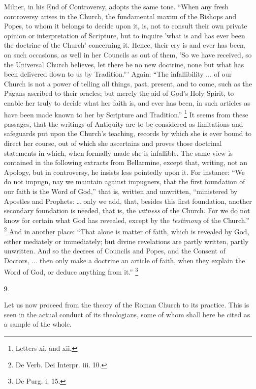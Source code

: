 Milner, in his End of Controversy, adopts the same tone. ``When
any fresh controversy arises in the Church, the fundamental maxim of
the Bishops and Popes, to whom it belongs to decide upon it, is, not
to consult their own private opinion or interpretation of Scripture,
but to inquire 'what is and has ever been the doctrine of the Church'
concerning it. Hence, their cry is and ever has been, on such
occasions, as well in her Councils as out of them, 'So we have
received, so the Universal Church believes, let there be no new
doctrine, none but what has been delivered down to us by
Tradition.''' Again: ``The infallibility ... of our
Church is not a power of telling all things, past, present, and to
come, such as the Pagans ascribed to their oracles; but merely the aid
of God's Holy Spirit, to enable her truly to decide what her faith is,
and ever has been, in such articles as have been made known to her by
Scripture and Tradition.'' \footnote{Letters xi. and xii.} It seems from these passages, that the writings of Antiquity
are to be considered as limitations and safeguards put upon the Church's
teaching, records by which she is ever bound to direct her course, out
of which she ascertains and proves those doctrinal statements in
which, when formally made she is infallible. The same view is
contained in the following extracts from Bellarmine, except that,
writing, not an Apology, but in controversy, he insists less pointedly
upon it. For instance: ``We do not impugn, nay we maintain against
impugners, that the first foundation of our faith is the Word of
God,'' that is, written and unwritten, ``ministered by
Apostles and Prophets: … only we add, that, besides this first
foundation, another secondary foundation is needed, that is, the \emph{witness}
of the Church. For we do not know for certain what God has revealed,
except by the \emph{testimony} of the Church.'' \footnote{De Verb. Dei Interpr. iii. 10.} And in another place: ``That alone is matter of faith,
which is revealed by God, either mediately or immediately; but divine
revelations are partly written, partly unwritten. And so the decrees
of Councils and Popes, and the Consent of Doctors, ... then only make
a doctrine an article of faith, when they explain the Word of God, or
deduce anything from it.'' \footnote{De Purg. i. 15.}

9.

Let us now proceed from the theory of the Roman Church to its
practice. This is seen in the actual conduct of its theologians,
some of whom shall here be cited as a sample of the whole.

